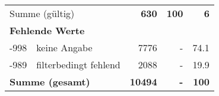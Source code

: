 \begin{longtable}{lXrrr}
     \midrule
     \multicolumn{2}{l}{Summe (gültig)} &
       \textbf{\num{630}} &
     \textbf{\num{100}} &
       \textbf{\num[round-mode=places,round-precision=2]{6}} \\
     \multicolumn{5}{l}{\textbf{Fehlende Werte}}\\
       -998 &
       keine Angabe &
         \num{7776} &
        - &
         \num[round-mode=places,round-precision=2]{74.1} \\
       -989 &
       filterbedingt fehlend &
         \num{2088} &
        - &
         \num[round-mode=places,round-precision=2]{19.9} \\
     \midrule
     \multicolumn{2}{l}{\textbf{Summe (gesamt)}} &
          \textbf{\num{10494}} &
        \textbf{-} &
        \textbf{\num{100}} \\
     \bottomrule
     \end{longtable}
     

